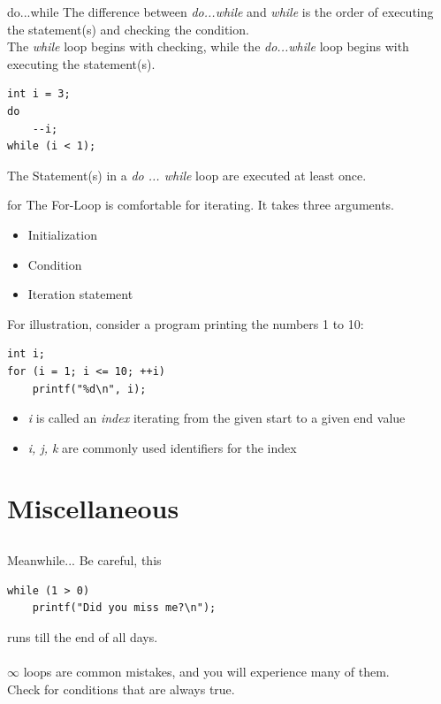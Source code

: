 \begin{frame}[fragile]{do...while}
	The difference between \textit{do...while} and \textit{while} is the order of executing the statement(s) and checking the condition.\\
	\bigskip
	The \textit{while} loop begins with checking, while the \textit{do...while} loop begins with executing the statement(s).
	\begin{lstlisting}[numbers=none]
int i = 3;
do
	--i;
while (i < 1);
\end{lstlisting}
	\bigskip
	The Statement(s) in a \textit{do ... while} loop are executed at least once.
\end{frame}
\begin{frame}[fragile]{for}
	The For-Loop is comfortable for iterating. It takes three arguments.
	\begin{itemize}
		\item Initialization
		\item Condition
		\item Iteration statement
	\end{itemize}
	\bigskip
	For illustration, consider a program printing the numbers 1 to 10:
	\begin{lstlisting}[numbers=none]
int i;
for (i = 1; i <= 10; ++i)
	printf("%d\n", i);
\end{lstlisting}
	\begin{itemize}
		\item \textit{i} is called an \textit{index} iterating from the given start to a given end value
		\item \textit{i, j, k} are commonly used identifiers for the index
	\end{itemize}
\end{frame}

\section{Miscellaneous}
\subsection{}
\begin{frame}[fragile]{Meanwhile...}
	Be careful, this
	\begin{lstlisting}[numbers=none]
while (1 > 0)
	printf("Did you miss me?\n");
\end{lstlisting}
runs till the end of all days.\\
\ \\$\infty$ loops are common mistakes, and you will experience many of them.\\
Check for conditions that are always true.
\end{frame}

